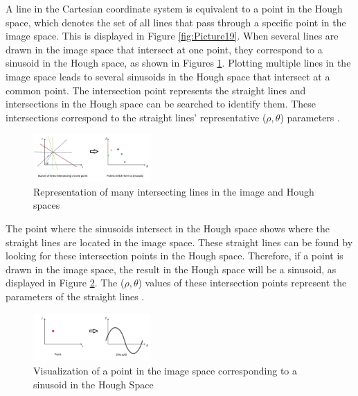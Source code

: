 \documentclass[conference]{IEEEtran}
\begin{document}
A line in the Cartesian coordinate system is equivalent to a point in the Hough space, which denotes the set of all lines that pass through a specific point in the image space. This is displayed in Figure \ref{fig:Picture19}. When several lines are drawn in the image space that intersect at one point, they correspond to a sinusoid in the Hough space, as shown in Figures \ref{fig:Picture20}. Plotting multiple lines in the image space leads to several sinusoids in the Hough space that intersect at a common point. The intersection point represents the straight lines and intersections in the Hough space can be searched to identify them. These intersections correspond to the straight lines' representative ($\rho, \theta$) parameters \cite{b15}. 

\begin{figure}[h]
    \centering
    \includegraphics[width=0.4\textwidth]{images/Picture20.png}
    \caption{Representation of many intersecting lines in the image and Hough spaces \cite{b15}}
    \label{fig:Picture20}
    
\end{figure}

The point where the sinusoids intersect in the Hough space shows where the straight lines are located in the image space. These straight lines can be found by looking for these intersection points in the Hough space. Therefore, if a point is drawn in the image space, the result in the Hough space will be a sinusoid, as displayed in Figure \ref{fig:Picture21}. The ($\rho, \theta$) values of these intersection points represent the parameters of the straight lines \cite{b15}. 

\begin{figure}[h]
    \centering
    \includegraphics[width=0.4\textwidth]{images/Picture21.png}
    \caption{Visualization of a point in the image space corresponding to a sinusoid in the Hough Space \cite{b15}}
    \label{fig:Picture21}
    
\end{figure}
\end{document}
